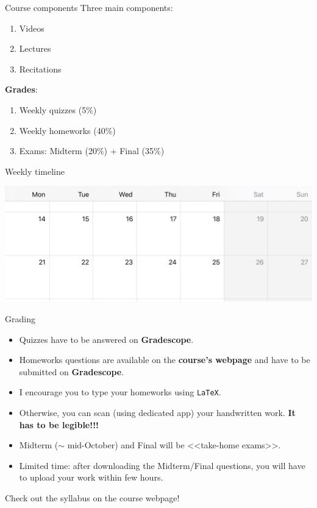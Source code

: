 \documentclass{beamer}
\begin{document}
\begin{frame}[t]{Course components}
	Three main components:
	\begin{enumerate}
		\item Videos 
		\item Lectures 
		\item Recitations 
	\end{enumerate}

	\vspace{0.5cm}
	\pause
	\textbf{Grades}:
	\begin{enumerate}
		\item Weekly quizzes (5\%)
		\item Weekly homeworks (40\%)
		\item Exams: Midterm (20\%) + Final (35\%)
	\end{enumerate}

\end{frame}
\begin{frame}{Weekly timeline}
	\begin{center}
		\includegraphics[width=\textwidth]{./timetable.jpg}
	\end{center}
\end{frame}

\begin{frame}[t]{Grading}
	\begin{itemize}
		\item Quizzes have to be answered on \textbf{Gradescope}.
		\item Homeworks questions are available on the \textbf{course's webpage} and have to be submitted on \textbf{Gradescope}.
			\pause
		\item I encourage you to type your homeworks using \texttt{LaTeX}.
		\item Otherwise, you can scan (using dedicated app) your handwritten work.
			{\bf It has to be legible!!!}
			\pause
		\item Midterm ($\sim$ mid-October) and Final will be <<take-home exams>>.
		\item Limited time: after downloading the Midterm/Final questions, you will have to upload your work within few hours.
	\end{itemize}
	\vspace{0.6cm}
	\begin{center}
		Check out the syllabus on the course webpage!
	\end{center}
\end{frame}
\end{document}
